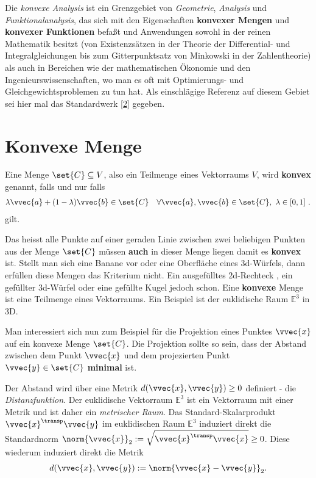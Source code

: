 \documentclass[
  12pt,
  british,
  a4paper,
  twoside,
  titlepage,
  openright,
  numbers=noenddot,
  chapterprefix=true,
  headings=optiontohead,
  svgnames,
  dvipsnames]{scrreprt}
\begin{document}
Die \emph{konvexe Analysis} ist ein Grenzgebiet von \emph{Geometrie},
\emph{Analysis} und \emph{Funktionalanalysis}, das sich mit den
Eigenschaften \textbf{konvexer Mengen} und \textbf{konvexer Funktionen}
befaßt und Anwendungen sowohl in der reinen Mathematik besitzt (von
Existenzsätzen in der Theorie der Differential- und Integralgleichungen
bis zum Gitterpunktsatz von Minkowski in der Zahlentheorie) als auch in
Bereichen wie der mathematischen Ökonomie und den
Ingenieurswissenschaften, wo man es oft mit Optimierungs- und
Gleichgewichtsproblemen zu tun hat. Als einschlägige Referenz auf diesem
Gebiet sei hier mal das Standardwerk
\protect\hyperlink{ref-rockafellar_convex_2015}{{[}2{]}} gegeben.

\hypertarget{konvexe-menge}{%
\section{Konvexe Menge}\label{konvexe-menge}}

Eine Menge \(\set{C} \subseteq V\), also ein Teilmenge eines Vektorraums
\(V\), wird \textbf{konvex} genannt, falls und nur falls
\begin{align} \lambda \vvec{a} + (1-\lambda) \vvec{b} \in \set{C} \quad \forall \vvec{a},\vvec{b} \in \set{C}, \ \lambda \in [0,1] \ . \end{align}
gilt.

Das heisst alle Punkte auf einer geraden Linie zwischen zwei beliebigen
Punkten aus der Menge \(\set{C}\) müssen \textbf{auch} in dieser Menge
liegen damit es \textbf{konvex} ist. Stellt man sich eine Banane vor
oder eine Oberfläche eines \(3\)d-Würfels, dann erfüllen diese Mengen
das Kriterium nicht. Ein ausgefülltes \(2\)d-Rechteck , ein gefüllter
\(3\)d-Würfel oder eine gefüllte Kugel jedoch schon. Eine
\textbf{konvexe} Menge ist eine Teilmenge eines Vektorraums. Ein
Beispiel ist der euklidische Raum \(\mathbb{E}^3\) in \(3\)D.

Man interessiert sich nun zum Beispiel für die Projektion eines Punktes
\(\vvec{x}\) auf ein konvexe Menge \(\set{C}\). Die Projektion sollte so
sein, dass der Abstand zwischen dem Punkt \(\vvec{x}\) und dem
projezierten Punkt \(\vvec{y} \in \set{C}\) \textbf{minimal} ist.

Der Abstand wird über eine Metrik \(d(\vvec{x},\vvec{y}) \geq 0\)
definiert - die \emph{Distanzfunktion}. Der euklidische Vektorraum
\(\mathbb{E}^3\) ist ein Vektorraum mit einer Metrik und ist daher ein
\emph{metrischer Raum}. Das Standard-Skalarprodukt
\(\vvec{x}^\transp \vvec{y}\) im euklidischen Raum \(\mathbb{E}^3\)
induziert direkt die Standardnorm
\(\norm{\vvec{x}}_2 := \sqrt{\vvec{x}^\transp \vvec{x}} \geq 0\). Diese
wiederum induziert direkt die Metrik
\begin{align} d(\vvec{x},\vvec{y}) := \norm{\vvec{x} - \vvec{y}}_2. \end{align}
\end{document}
